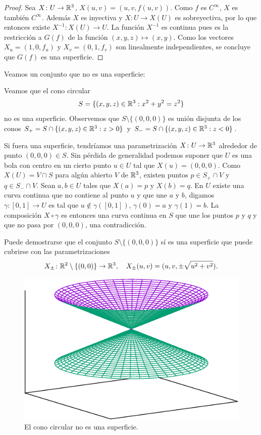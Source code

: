 \begin{proof}
	Sea $X\colon U\to\mathbb{R}^3$, $X(u,v)=(u,v,f(u,v))$. Como $f$ es $C^{\infty}$,
	$X$ es también $C^{\infty}$. Además $X$ es inyectiva y $X\colon U\to X(U)$
	es sobreyectiva, por lo que entonces existe $X^{-1}\colon X(U)\to U$. La
	función $X^{-1}$ es continua pues es la restricción a $G(f)$ de la
	función $(x,y,z)\mapsto (x,y)$.  Como los vectores $X_u=(1,0,f_u)$ y
	$X_v=(0,1,f_v)$ son linealmente independientes, se concluye que $G(f)$ es
	una superficie.
\end{proof}

Veamos un conjunto que no es una superficie: 

\begin{example}
	Veamos que el cono circular 
	\[
		S=\{(x,y,z)\in\mathbb{R}^3:x^2+y^2=z^2\}
	\]
	no es una superficie. Observemos que $S\setminus\{(0,0,0)\}$ es unión
	disjunta de los conos $S_+=S\cap\{(x,y,z)\in\mathbb{R}^3:z>0\}$ y
	$S_-=S\cap\{(x,y,z)\in\mathbb{R}^3:z<0\}$. 
	
	Si fuera una superficie, tendríamos una parametrización $X\colon U\to\mathbb{R}^3$
	alrededor de punto $(0,0,0)\in S$. Sin pérdida de generalidad podemos
	suponer que $U$ es una bola con centro en un cierto punto $u\in U$ tal que
	$X(u)=(0,0,0)$. Como $X(U)=V\cap S$ para algún abierto $V$ de $\mathbb{R}^3$,
	existen puntos $p\in S_+\cap V$ y $q\in S_-\cap V$. Sean $a,b\in U$ tales
	que $X(a)=p$ y $X(b)=q$. En $U$ existe una curva continua que no contiene
	al punto $u$ y que une $a$ y $b$, digamos $\gamma\colon [0,1]\to U$ es tal
	que $u\not\in\gamma([0,1])$, $\gamma(0)=a$ y $\gamma(1)=b$. La composición
	$X\circ\gamma$ es entonces una curva continua en $S$ que une los puntos $p$
	y $q$ y que no pasa por $(0,0,0)$, una contradicción.

	Puede demostrarse que el conjunto $S\setminus\{(0,0,0)\}$ sí es una
	superficie que puede cubrirse con las parametrizaciones
	\[
		X_{\pm}\colon\mathbb{R}^2\setminus\{(0,0)\}\to\mathbb{R}^3,\quad
		X_{\pm}(u,v)=(u,v,\pm\sqrt{u^2+v^2}).
	\]

	\begin{figure}
		\centering
    	\includegraphics[scale=0.3]{eps/cono}
		\caption{El cono circular no es una superficie.}
		\label{fig:cono}
	\end{figure}
\end{example}

